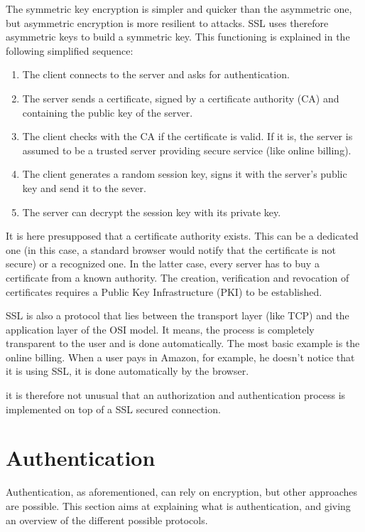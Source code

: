 The symmetric key encryption is simpler and quicker than the asymmetric one, but asymmetric encryption is more resilient to attacks. SSL uses therefore asymmetric keys to build a symmetric key. This functioning is explained in the following simplified sequence:

\begin{enumerate}
	\item The client connects to the server and asks for authentication.
	\item The server sends a certificate, signed by a certificate authority (CA) and containing the public key of the server.
	\item The client checks with the CA if the certificate is valid. If it is, the server is assumed to be a trusted server providing secure service (like online billing).
	\item The client generates a random session key, signs it with the server's public key and send it to the sever.
	\item The server can decrypt the session key with its private key.
\end{enumerate}

It is here presupposed that a certificate authority exists. This can be a dedicated one (in this case, a standard browser would notify that the certificate is not secure) or a recognized one. In the latter case, every server has to buy a certificate from a known authority. The creation, verification and revocation of certificates requires a Public Key Infrastructure (PKI) to be established.

SSL is also a protocol that lies between the transport layer (like TCP) and the application layer of the OSI model. It means, the process is completely transparent to the user and is done automatically. The most basic example is the online billing. When a user pays in Amazon, for example, he doesn't notice that it is using SSL, it is done automatically by the browser.

it is therefore not unusual that an authorization and authentication process is implemented on top of a SSL secured connection.


\section{Authentication}
Authentication, as aforementioned, can rely on encryption, but other approaches are possible. This section aims at explaining what is authentication, and giving an overview of the different possible protocols. 

